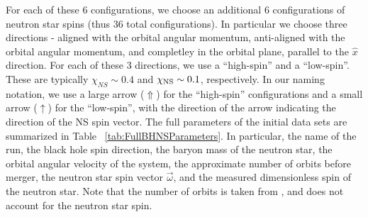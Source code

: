 For each of these 6
configurations, we choose an additional 6 configurations of neutron
star spins (thus 36 total configurations). In particular we choose
three directions - aligned with the orbital angular momentum,
anti-aligned with the orbital angular momentum, and completley in the
orbital plane, parallel to the $\hat{x}$ direction. For each of these
3 directions, we use a ``high-spin'' and a ``low-spin''. These are
typically $\chi_{NS}\sim 0.4$ and $\chi_{\rm NS}\sim 0.1$,
respectively. In our naming notation, we use a large arrow
($\Uparrow$)  for the ``high-spin'' configurations and a small arrow
($\uparrow$) for the ``low-spin'', with the direction of the arrow
indicating the direction of the NS spin vector. The full parameters of
the initial data sets are summarized in Table
~\ref{tab:FullBHNSParameters}. In particular, the name of the run,
the black hole spin direction, the baryon mass of the neutron star, the orbital angular velocity of the system,
the approximate number of orbits before merger, the neutron star spin vector $\vec{\omega}$, and the measured dimensionless
spin of the neutron star. Note that the number of orbits is taken from
\cite{Foucart:2013a}, and does not account for the neutron star
spin. 

